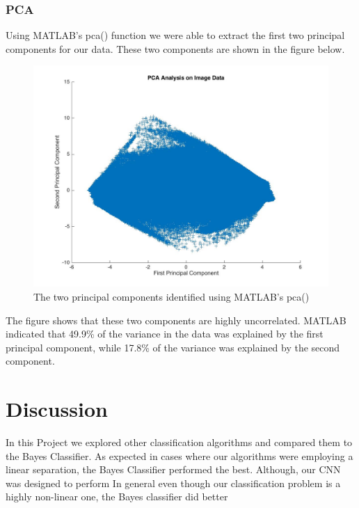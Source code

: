 \documentclass[12pt]{article}
\begin{document}
	\subsubsection{PCA}
	Using MATLAB's pca() function we were able to extract the first two principal components for our data. These two components are shown in the figure below.
	\begin{figure}[h]
		\centering
		\includegraphics[scale=.25]{./images/PCA_Analysis.jpg}
		\caption{The two principal components identified using MATLAB's pca()}
	\end{figure}
	The figure shows that these two components are highly uncorrelated. MATLAB indicated that 49.9\% of the variance in the data was explained by the first principal component, while 17.8\% of the variance was explained by the second component. 


\section{Discussion}
In this Project we explored other classification algorithms and compared them to the Bayes Classifier.  As expected in cases where our algorithms were employing a linear separation, the Bayes Classifier performed the best. 
Although, our CNN was designed to perform In general even though our classification problem is a highly non-linear one, the Bayes classifier did better 


   
\end{document}
